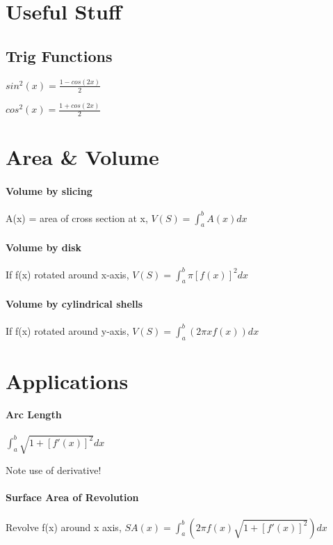 \documentclass[10pt,landscape]{article}
\begin{document}
	
	\raggedright
	\footnotesize
	\begin{multicols}{4}
\section{Useful Stuff}
\subsection{Trig Functions}

$sin^2(x) = \frac{1-cos(2x)}{2}$

$cos^2(x) = \frac{1+cos(2x)}{2}$


\section{Area \& Volume}

\paragraph{Volume by slicing}
A(x) = area of cross section at x,
$V(S) = \int_{a}^{b}A(x)dx$

\paragraph{Volume by disk}
If f(x) rotated around x-axis,
$V(S) = \int_{a}^{b}\pi [f(x)]^2dx$

\paragraph{Volume by cylindrical shells}
If f(x) rotated around y-axis,
$V(S) = \int_{a}^{b}(2\pi x f(x))dx$

\section{Applications}

\paragraph{Arc Length}
$\int_{a}^{b} \sqrt{1+[f'(x)]^2}dx$

Note use of derivative!

\paragraph{Surface Area of Revolution}
Revolve f(x) around x axis,
$SA(x) = \int_{a}^{b}(2 \pi f(x) \sqrt{1+[f'(x)]^2})dx$


\end{multicols}
\end{document}
